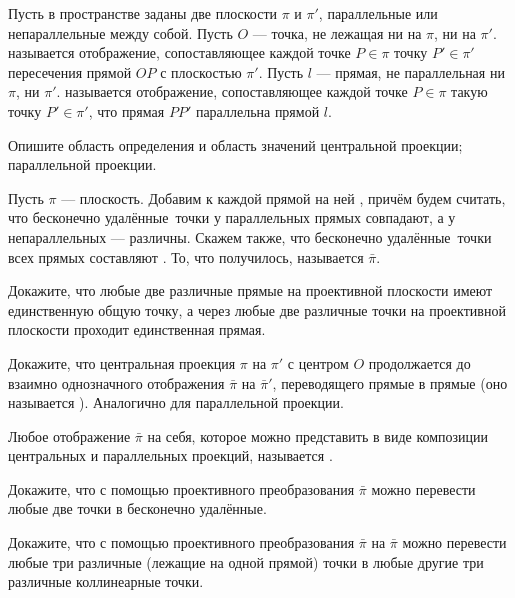 \documentclass[12pt]{article}
\begin{document}


Пусть в пространстве заданы две плоскости $\pi$ и $\pi'$, параллельные или непараллельные между собой. Пусть $O$ --- точка, не лежащая ни на $\pi$, ни на $\pi'$.  называется отображение, сопоставляющее каждой точке $P\in\pi$ точку $P'\in\pi'$ пересечения прямой $OP$ с плоскостью $\pi'$. Пусть $l$ --- прямая, не параллельная ни $\pi$, ни $\pi'$.
 называется отображение, сопоставляющее каждой точке $P\in\pi$ такую точку $P'\in\pi'$, что прямая $PP'$ параллельна прямой $l$.

Опишите область определения и область значений центральной проекции; параллельной проекции.

Пусть $\pi$ --- плоскость. Добавим к каждой прямой на ней , причём будем считать, что  бесконечно удалённые\ точки у параллельных прямых совпадают, а у непараллельных --- различны. Скажем также, что  бесконечно удалённые\ точки всех прямых составляют . То, что получилось, называется  $\bar\pi$.

Докажите, что любые две различные прямые на проективной плоскости имеют единственную общую точку, а через любые две различные точки на проективной плоскости проходит единственная прямая.

Докажите, что центральная проекция $\pi$ на $\pi'$ с центром $O$ продолжается до взаимно однозначного отображения $\bar\pi$ на $\bar\pi'$, переводящего прямые в прямые (оно называется ). Аналогично для параллельной проекции.

Любое отображение $\bar\pi$ на себя, которое можно представить в виде композиции центральных и параллельных проекций, называется .

Докажите, что с помощью проективного преобразования $\bar\pi$ можно перевести любые две точки в  бесконечно удал\"енные.

Докажите, что с помощью проективного преобразования $\bar\pi$ на $\bar\pi$ можно перевести любые три различные  (лежащие на одной прямой) точки в любые другие три различные коллинеарные точки.
\end{document}
